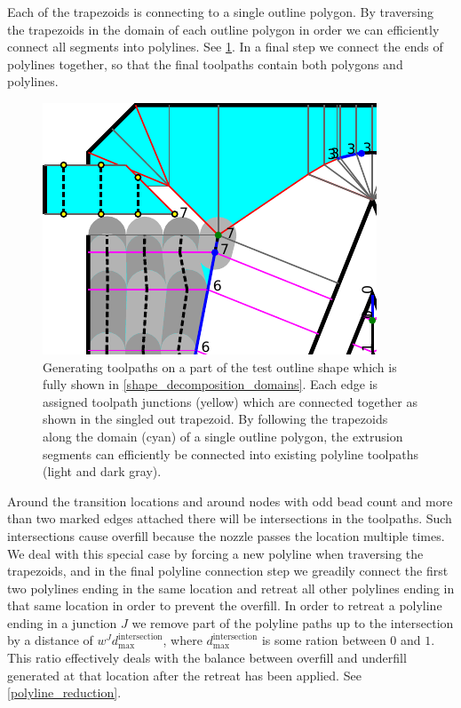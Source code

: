 Each of the trapezoids is connecting to a single outline polygon.
By traversing the trapezoids in the domain of each outline polygon in order we can efficiently connect all segments into polylines.
See \cref{segment_generation}.
In a final step we connect the ends of polylines together, so that the final toolpaths contain both polygons and polylines.

\begin{figure}
\centering
\includegraphics[width=.5\columnwidth]{sources/method/segment_generation.pdf}
\caption{
Generating toolpaths on a part of the test outline shape which is fully shown in \cref{shape_decomposition_domains}.
Each edge is assigned toolpath junctions (yellow) which are connected together as shown in the singled out trapezoid.
By following the trapezoids along the domain (cyan) of a single outline polygon,
the extrusion segments can efficiently be connected into existing polyline toolpaths (light and dark gray).
}
\label{segment_generation}
\end{figure}


Around the transition locations and around nodes with odd bead count and more than two marked edges attached there will be intersections in the toolpaths.
Such intersections cause overfill because the nozzle passes the location multiple times.
We deal with this special case by forcing a new polyline when traversing the trapezoids, and in the final polyline connection step we greadily connect the first two polylines ending in the same location and retreat all other polylines ending in that same location in order to prevent the overfill.
In order to retreat a polyline ending in a junction $J$ we remove part of the polyline paths up to the intersection by a distance of $w^J d_\text{max}^\text{intersection}$, where $d_\text{max}^\text{intersection}$ is some ration between $0$ and $1$.
This ratio effectively deals with the balance between overfill and underfill generated at that location after the retreat has been applied.
See \cref{polyline_reduction}.


